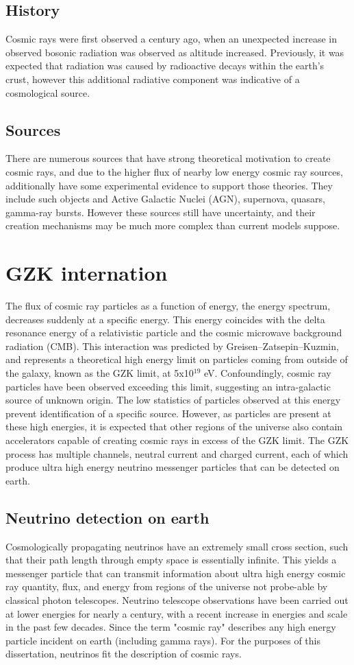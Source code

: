 	\subsection{History}
		Cosmic rays were first observed a century ago, when an unexpected increase in observed bosonic radiation was observed as altitude increased.  Previously, it was expected that radiation was caused by radioactive decays within the earth's crust, however this additional radiative component was indicative of a cosmological source.
	\subsection{Sources}
		There are numerous sources that have strong theoretical motivation to create cosmic rays, and due to the higher flux of nearby low energy cosmic ray sources, additionally have some experimental evidence to support those theories.  They include such objects and Active Galactic Nuclei (AGN), supernova, quasars, gamma-ray bursts.  However these sources still have uncertainty, and their creation mechanisms may be much more complex than current models suppose.


\section{GZK internation}
		The flux of cosmic ray particles as a function of energy, the energy spectrum, decreases suddenly at a specific energy.  This energy coincides with the delta resonance energy of a relativistic particle and the cosmic microwave background radiation (CMB).  This interaction was predicted by Greisen–Zatsepin–Kuzmin, and represents a theoretical high energy limit on particles coming from outside of the galaxy, known as the GZK limit, at 5x10$^{19}$ eV.  Confoundingly, cosmic ray particles have been observed exceeding this limit, suggesting an intra-galactic source of unknown origin.  The low statistics of particles observed at this energy prevent identification of a specific source.  However, as particles are present at these high energies, it is expected that other regions of the universe also contain accelerators capable of creating cosmic rays in excess of the GZK limit.  The GZK process has multiple channels, neutral current and charged current, each of which produce ultra high energy neutrino messenger particles that can be detected on earth.

\subsection{Neutrino detection on earth}
		Cosmologically propagating neutrinos have an extremely small cross section, such that their path length through empty space is essentially infinite.  This yields a messenger particle that can transmit information about ultra high energy cosmic ray quantity, flux, and energy from regions of the universe not probe-able by classical photon telescopes.  Neutrino telescope observations have been carried out at lower energies for nearly a century, with a recent increase in energies and scale in the past few decades.  Since the term "cosmic ray" describes any high energy particle incident on earth (including gamma rays).  For the purposes of this dissertation, neutrinos fit the description of cosmic rays.
